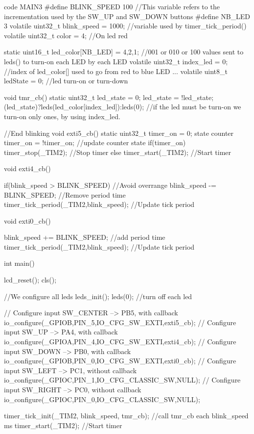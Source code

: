 {\begin{Cpp}{code MAIN3}
#define BLINK_SPEED    100      //This variable refers to the incrementation used by the SW_UP and SW_DOWN buttons
#define NB_LED 3
volatile uint32_t blink_speed = 1000;  //variable used by timer_tick_period()
volatile uint32_t color = 4;  //On led red

static uint16_t led_color[NB_LED] = {4,2,1};  //001 or 010 or 100 values sent to leds() to turn-on each LED by each LED
volatile uint32_t index_led = 0; //index of led_color[] used to go from red to blue LED ...
volatile uint8_t ledState = 0; //led turn-on or turn-down


void tmr_cb()
{
    static uint32_t led_state = 0;
    led_state = !led_state;
	(led_state)?leds(led_color[index_led]):leds(0); //if the led must be turn-on we turn-on only ones, by using index_led.
}

//End blinking
void exti5_cb()
{
    static uint32_t timer_on = 0;  state counter
    timer_on = !timer_on;   //update counter state
    if(timer_on)
    {
        timer_stop(_TIM2);    //Stop timer
    }
    else
    {
        timer_start(_TIM2);   //Start timer
    }
}


void exti4_cb()
{
	if(blink_speed > BLINK_SPEED) //Avoid overrange
	{
		blink_speed -= BLINK_SPEED; //Remove period time
	}
	timer_tick_period(_TIM2,blink_speed); //Update tick period

}


void exti0_cb()
{
    blink_speed += BLINK_SPEED;         //add period time
	timer_tick_period(_TIM2,blink_speed);   //Update tick period

}

int main()
{
    lcd_reset(); cls();
    
    //We configure all leds
    leds_init();
    leds(0); //turn off each led
    
	// Configure input SW_CENTER --> PB5, with callback
	io_configure(_GPIOB,PIN_5,IO_CFG_SW_EXTI,exti5_cb);
    // Configure input SW_UP --> PA4, with callback
	io_configure(_GPIOA,PIN_4,IO_CFG_SW_EXTI,exti4_cb);
    // Configure input SW_DOWN --> PB0, with callback
	io_configure(_GPIOB,PIN_0,IO_CFG_SW_EXTI,exti0_cb);
    // Configure input SW_LEFT --> PC1, without callback
	io_configure(_GPIOC,PIN_1,IO_CFG_CLASSIC_SW,NULL);	
	// Configure input SW_RIGHT --> PC0, without callback
	io_configure(_GPIOC,PIN_0,IO_CFG_CLASSIC_SW,NULL);

    

    timer_tick_init(_TIM2, blink_speed, tmr_cb);  //call tmr_cb each blink_speed ms
	timer_start(_TIM2);                             //Start timer 

}
\end{Cpp}}
